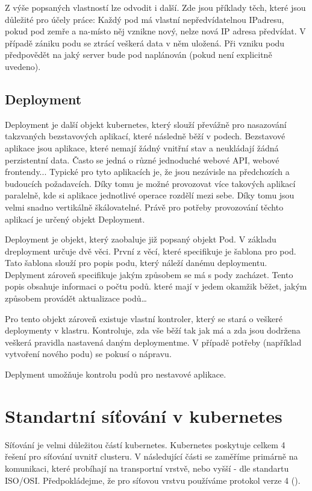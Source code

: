 Z výše popsaných vlastností lze odvodit i další. Zde jsou příklady těch, které jsou důležité pro účely práce: Každý pod má vlastní nepředvídatelnou IPadresu, pokud pod zemře a na-místo něj vznikne nový, nelze nová IP adresa předvídat. V případě zániku podu se ztrácí veškerá data v něm uložená. Při vzniku podu předpovědět na jaký server bude pod naplánován (pokud není explicitně uvedeno). 

\subsection{Deployment}
Deployment je další objekt kubernetes, který slouží převážně pro nasazování takzvaných bezstavových aplikací, které následně běží v podech. Bezstavové aplikace jsou aplikace, které nemají žádný vnitřní stav a neukládají žádná perzistentní data. Často se jedná o různé jednoduché webové API, webové frontendy... Typické pro tyto aplikacích je, že jsou nezávisle na předchozích a budoucích požadavcích. Díky tomu je možné provozovat více takových aplikací paralelně, kde si aplikace jednotlivé operace rozdělí mezi sebe. Díky tomu jsou velmi snadno vertikálně škálovatelné. Právě pro potřeby provozování těchto aplikací je určený objekt Deployment.

Deployment je objekt, který zaobaluje již popsaný objekt Pod. V základu dreployment určuje dvě věci. První z věcí, které specifikuje je šablona pro pod. Tato šablona slouží pro popis podu, který náleží danému deploymentu. Deplyment zároveň specifikuje jakým způsobem se má s pody zacházet. Tento popis obsahuje informaci o počtu podů. které mají v jedem okamžik běžet, jakým způsobem provádět aktualizace podů\ldots

Pro tento objekt zároveň existuje vlastní kontroler, který se stará o veškeré deploymenty v klastru. Kontroluje, zda vše běží tak jak má a zda jsou dodržena veškerá pravidla nastavená daným deploymentme. V případě potřeby (například vytvoření nového podu) se pokusí o nápravu.

Deplyment umožňuje kontrolu podů pro nestavové aplikace.
\section{Standartní síťování v kubernetes}
Síťování je velmi důležitou částí kubernetes. Kubernetes poskytuje celkem 4 řešení pro síťování uvnitř clusteru. V následující části se zaměříme primárně na komunikaci, které probíhají na transportní vrstvě, nebo vyšší - dle standartu ISO/OSI. Předpokládejme, že pro síťovou vrstvu používáme protokol  verze 4 ().

